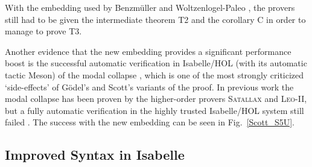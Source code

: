 \documentclass{article}
\begin{document}
With the embedding used by Benzm\"uller and Woltzenlogel-Paleo , the
provers still had to be given the intermediate theorem T2 and the corollary
C in order to manage to prove T3.

Another evidence that the new embedding provides a significant performance boost 
is the successful automatic verification in Isabelle/HOL (with its automatic tactic Meson) of the modal
collapse \cite{Sobel}, which is one of the most strongly criticized
`side-effects' of G\"odel's and Scott's variants of the proof. In previous work 
the modal collapse has been proven by the higher-order provers
\textsc{Satallax} \cite{Satallax} and \textsc{Leo-II}, but a fully automatic
verification in the highly trusted Isabelle/HOL system still failed
\cite{J28}.  The success with the new embedding can be seen in Fig.~\ref{Scott_S5U}.




\subsection{Improved Syntax in Isabelle}\label{sec:improvedsyntax}
\end{document}
